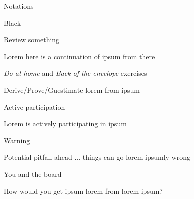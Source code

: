 \documentclass{MichiganTech}
\begin{document}
%
\begin{frame}[t]{Notations}
  \vspace*{0.10in}
  \begin{reference}{4mm}{85.5mm}{Black}
    \;
  \end{reference}

  \begin{beamerboxesrounded}[upper=reviewboxhead,lower=reviewboxbody,shadow=true]{Review something}
    \begin{flushleft}
      Lorem here is a continuation of ipsum from there
    \end{flushleft}
  \end{beamerboxesrounded}

  \vspace*{0.075in}
  \begin{beamerboxesrounded}[upper=freetimeboxhead,lower=freetimeboxbody,shadow=true]{\textsl{Do at home} and \textsl{Back of the envelope} exercises}
    \begin{flushleft}
      Derive/Prove/Guestimate lorem from ipsum
    \end{flushleft}
  \end{beamerboxesrounded}

  \vspace*{0.075in}
  \begin{beamerboxesrounded}[upper=activepartyboxhead,lower=activepartyboxbody,shadow=true]{Active participation}
    \begin{flushleft}
      Lorem is actively participating in ipsum
    \end{flushleft}
  \end{beamerboxesrounded}

  \vspace*{0.075in}
  \begin{beamerboxesrounded}[upper=warningboxhead,lower=warningboxbody,shadow=true]{Warning}
    \begin{flushleft}
      Potential pitfall ahead ... things can go lorem ipsumly wrong
    \end{flushleft}
  \end{beamerboxesrounded}

  \vspace*{0.075in}
  \begin{beamerboxesrounded}[upper=questionboxhead,lower=questionboxbody,shadow=true]{You and the board}
    \begin{flushleft}
      How would you get ipsum lorem from lorem ipsum?
    \end{flushleft}
  \end{beamerboxesrounded}
\end{frame}
\end{document}
